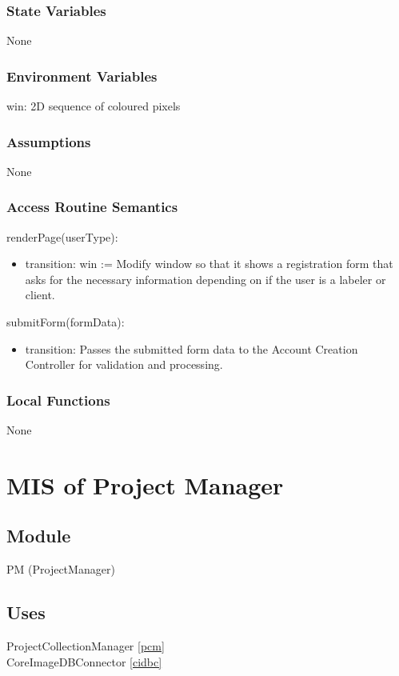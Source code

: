 \documentclass[12pt, titlepage]{article}
\begin{document}
\subsubsection{State Variables}
None
\subsubsection{Environment Variables}
win: 2D sequence of coloured pixels

\subsubsection{Assumptions}
None

\subsubsection{Access Routine Semantics}

\noindent renderPage(userType):
\begin{itemize}
\item transition: win := Modify window so that it shows a registration form that asks for the necessary information depending on if the user is a labeler or client.
\end{itemize}

\noindent submitForm(formData):
\begin{itemize}
\item transition: Passes the submitted form data to the Account Creation Controller for validation and processing.
\end{itemize}

\subsubsection{Local Functions}
None




\section{MIS of Project Manager} \label{pm} 
    \subsection{Module}
        PM (ProjectManager)

    \subsection{Uses}
        ProjectCollectionManager \ref{pcm}\\
        CoreImageDBConnector \ref{cidbc}
\end{document}
